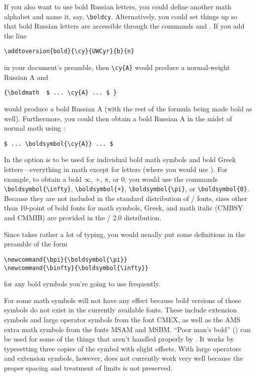 If you also want to use bold Russian letters, you could define
another math alphabet and name it, say, \verb=\boldcy=.
Alternatively, you could set things up so that bold Russian
letters are accessible through the commands 
and .
If you add the line
\begin{verbatim}
\addtoversion{bold}{\cy}{UWCyr}{b}{n}
\end{verbatim}
in your document's preamble,
then \verb=\cy{A}= would produce a normal-weight Russian A
and
\begin{verbatim}
{\boldmath  $ ... \cy{A} ... $ }
\end{verbatim}
would produce a bold Russian A (with the rest of the formula being
made bold as well).  Furthermore, you could then obtain
a bold Russian A in the midst of normal math using :
\begin{verbatim}
$ ... \boldsymbol{\cy{A}} ... $
\end{verbatim}

In the  option  is to be used for
individual bold math symbols and bold Greek letters---everything in
math except for letters (where you would use ).  For example,
to obtain a bold $\infty$, $+$, $\pi$, or $0$, you would use the
commands \verb"\boldsymbol{\infty}", \verb"\boldsymbol{+}",
\verb"\boldsymbol{\pi}", or \verb"\boldsymbol{0}".   Because they are
not included in the  standard distribution of \tex/ fonts,  sizes
other than 10-point of bold fonts for math symbols, Greek, and math
italic ({\sc CMBSY} and {\sc CMMIB}) are provided in the \amsfonts/
2.0 distribution.

Since  takes rather a lot of typing, you would usually
put some definitions in the preamble of the form
\begin{verbatim}
\newcommand{\bpi}{\boldsymbol{\pi}}
\newcommand{\binfty}{\boldsymbol{\infty}}
\end{verbatim}
for any bold symbols you're going to use frequently.

For some math symbols  will not have any effect because
bold versions of those symbols do not exist in the currently available
fonts.  These include
extension symbols and large operator symbols from the font CMEX, as well
as the AMS extra math symbols from the fonts MSAM and MSBM.
``Poor man's bold'' () can be used for some of the
things that aren't handled properly by .  It works by
typesetting three copies of the symbol with slight offsets.
With large operators and extension symbols, however,  does not
currently work very well because the proper spacing and treatment of
limits is not preserved.

